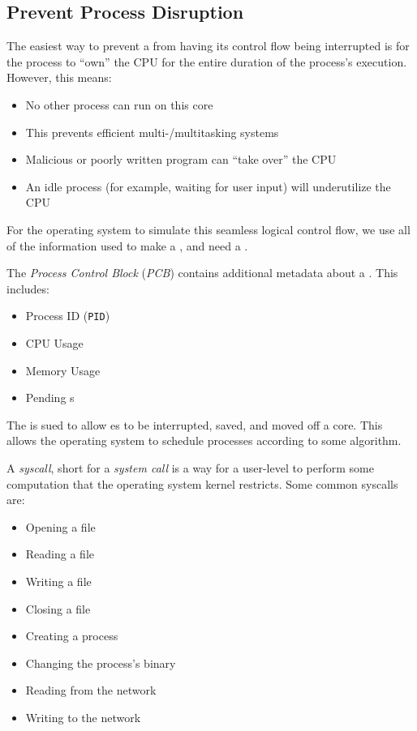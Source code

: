 \subsection{Prevent Process Disruption}\label{subsec:Prevent_Process_Disruption}
The easiest way to prevent a  from having its control flow being interrupted is for the process to ``own'' the CPU for the entire duration of the process's execution.
However, this means:
\begin{itemize}[noitemsep]
\item No other process can run on this core
\item This prevents efficient multi-/multitasking systems
\item Malicious or poorly written program can ``take over'' the CPU
\item An idle process (for example, waiting for user input) will underutilize the CPU
\end{itemize}

For the operating system to simulate this seamless logical control flow, we use all of the information used to make a , and need a .
\begin{definition}\label{def:Process_Control_Block}
  The \emph{Process Control Block} (\emph{PCB}) contains additional metadata about a .
  This includes:
  \begin{itemize}[noitemsep]
  \item Process ID (\texttt{PID})
  \item CPU Usage
  \item Memory Usage
  \item Pending s
  \end{itemize}
\end{definition}

The  is sued to allow es to be interrupted, saved, and moved off a core.
This allows the operating system to schedule processes according to some algorithm.

\begin{definition}[Syscall]\label{def:Syscall}
  A \emph{syscall}, short for a \emph{system call} is a way for a user-level  to perform some computation that the operating system kernel restricts.
  Some common syscalls are:
  \begin{itemize}[noitemsep]
  \item Opening a file
  \item Reading a file
  \item Writing a file
  \item Closing a file
  \item Creating a process
  \item Changing the process's binary
  \item Reading from the network
  \item Writing to the network
  \end{itemize}
\end{definition}

